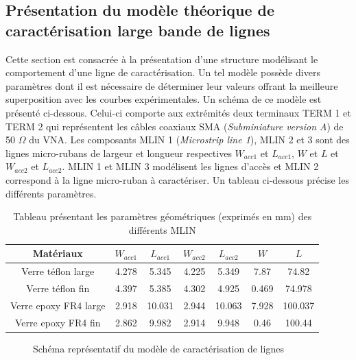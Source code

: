 \documentclass[french]{article}
\begin{document}
\newpage

\subsection{Présentation du modèle théorique de caractérisation large bande de lignes}

Cette section est consacrée à la présentation d'une structure modélisant le comportement d'une ligne de caractérisation. Un tel modèle possède divers paramètres dont il est nécessaire de déterminer leur valeurs offrant la meilleure superposition avec les courbes expérimentales. Un schéma de ce modèle est présenté ci-dessous. Celui-ci comporte aux extrémités deux terminaux TERM 1 et TERM 2 qui représentent les câbles coaxiaux SMA (\textit{Subminiature version A}) de 50 $\Omega$ du VNA. Les composants MLIN 1 (\textit{Microstrip line 1}), MLIN 2 et 3 sont des lignes micro-rubans de largeur et longueur respectives $W_{acc1}$ et $L_{acc1}$, $W$ et $L$ et $W_{acc2}$ et $L_{acc2}$. MLIN 1 et MLIN 3 modélisent les lignes d'accès et MLIN 2 correspond à la ligne micro-ruban à caractériser. Un tableau ci-dessous précise les différents paramètres.

\begin{table}[H]
	\centering
	\begin{tabular}{|c|c|c|c|c|c|c|}
		\hline
		Matériaux & $W_{acc1}$ & $L_{acc1}$ & $W_{acc2}$ & $L_{acc2}$ & $W$ & $L$\\
		\hline
		Verre téflon large & 4.278 & 5.345 & 4.225 & 5.349 & 7.87 & 74.82 \\
		\hline
		Verre téflon fin & 4.397 & 5.385 & 4.302 & 4.925 & 0.469 & 74.978\\
		\hline
		Verre epoxy FR4 large & 2.918 & 10.031 & 2.944 & 10.063 & 7.928 & 100.037\\
		\hline
		Verre epoxy FR4 fin & 2.862 & 9.982 & 2.914 & 9.948 & 0.46 & 100.44\\
		\hline
	\end{tabular}
	\caption{Tableau présentant les paramètres géométriques (exprimés en mm) des différents MLIN}
\end{table}


\begin{figure}[H]
	\centering
	
	\caption{Schéma représentatif du modèle de caractérisation de lignes}
	\label{fig:schema_modele_caract}
\end{figure}
\end{document}
